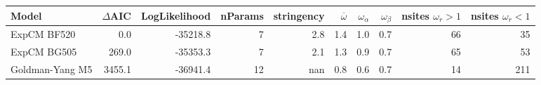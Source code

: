 \begin{tabular}{lrrrrrrrrr}
\toprule
           Model &  $\Delta$AIC &  LogLikelihood &  nParams &  stringency &  $\overline{\omega}$ &  $\omega_{\alpha}$ &  $\omega_{\beta}$ &  nsites $\omega_r > 1$ &  nsites $\omega_r < 1$ \\
\midrule
     ExpCM BF520 &          0.0 &       -35218.8 &        7 &         2.8 &                  1.4 &                1.0 &               0.7 &                     66 &                     35 \\
     ExpCM BG505 &        269.0 &       -35353.3 &        7 &         2.1 &                  1.3 &                0.9 &               0.7 &                     65 &                     53 \\
 Goldman-Yang M5 &       3455.1 &       -36941.4 &       12 &         nan &                  0.8 &                0.6 &               0.7 &                     14 &                    211 \\
\bottomrule
\end{tabular}
